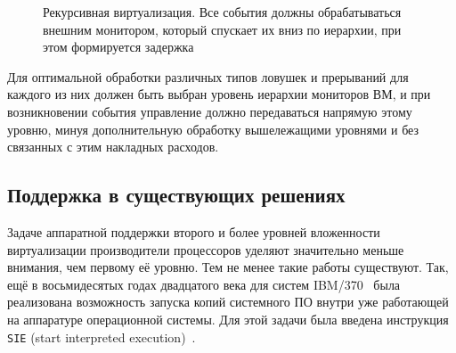 \begin{figure}[htb]
    \centering
{}
    \caption[Рекурсивная виртуализация]{Рекурсивная виртуализация. Все события должны обрабатываться внешним монитором, который спускает их вниз по иерархии, при этом формируется задержка}
    \label{fig:recursive-vm}
\end{figure}

Для оптимальной обработки различных типов ловушек и прерываний для каждого из них должен быть выбран уровень иерархии мониторов ВМ, и при возникновении события управление должно передаваться напрямую этому уровню, минуя дополнительную обработку вышележащими уровнями и без связанных с этим накладных расходов.

\subsection{Поддержка в существующих решениях}

Задаче аппаратной поддержки второго и более уровней вложенности виртуализации производители процессоров уделяют значительно меньше внимания, чем первому её уровню. Тем не менее такие работы существуют. Так, ещё в восьмидесятых годах двадцатого века для систем IBM/370~\cite{Osisek:1991:EIA:106229.120150} была реализована возможность запуска копий системного ПО внутри уже работающей на аппаратуре операционной системы. Для этой задачи была введена инструкция \texttt{SIE} (\abbr start interpreted execution)~\cite{sie-comp-arch}.

